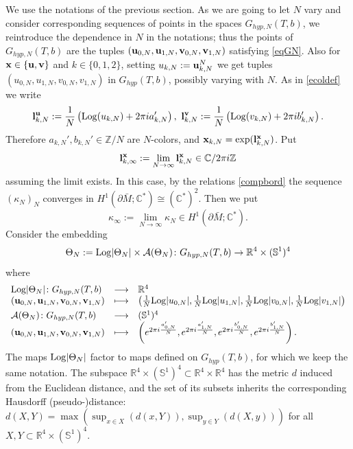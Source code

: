 \documentclass[11pt]{amsart}
\newcommand{\fleche}[4]{                     %
            \begin{array}{lcll} #1 & \longrightarrow & #2 \\   %
                         #3 &\longmapsto & #4          %
            \end{array}}
\newcommand{\mc}{\mathbb{C}}
\newcommand{\mz}{\mathbb{Z}}
\newcommand{\bu}{{\bf u}}
\newcommand{\bx}{{\bf x}}
\newcommand{\bv}{{\bf v}}
\newcommand{\bl}{{\bf l}}
\newcommand{\Log}{{\rm Log}}
\begin{document}
{We use the notations of the previous section. As we are going to let $N$ vary and consider corresponding sequences of points in the spaces $G_{hyp,N}(T,b)$, we reintroduce the dependence in $N$ in the notations; thus the points of $G_{hyp,N}(T,b)$ are the tuples $(\bu_{0,N},\bu_{1,N},\bv_{0,N},\bv_{1,N})$ satisfying \eqref{eqGN}. Also for ${\bf x}\in \{\bu,\bv\}$ and $k\in\{0,1,2\}$, setting $u_{k,N} := \bu_{k,N}^N$ we get tuples $(u_{0,N},u_{1,N},v_{0,N},v_{1,N})$ in $G_{hyp}(T,b)$, possibly varying with $N$. As in \eqref{ecoldef} we write
\begin{equation}\label{defseqNcolor}\bl_{k,N}^\bu := \frac{1}{N}\left(\Log(u_{k,N})+2\pi i a_{k,N}' \right),\  \bl_{k,N}^\bv := \frac{1}{N}\left(\Log(v_{k,N})+2\pi i b_{k,N}' \right).
\end{equation}
Therefore $a_{k,N}',b_{k,N}'\in \mz/N$ are $N$-colors, and $\bx_{k,N} = \exp(\bl_{k,N}^\bx)$. Put
\begin{equation}\label{deflimlkmars26}
\bl_{k,\infty}^{\bf x} := \lim_{N\rightarrow \infty} \bl_{k,N}^{\bf x}  \in \mc/2\pi i \mz
\end{equation}
assuming the limit exists. In this case, by the relations \eqref{compbord} the sequence $(\kappa_N)_N$ converges in $H^1(\partial \bar M; \mc^*) \cong (\mc^*)^2$. Then we put
$$\kappa_\infty := \lim_{N\rightarrow \infty}\kappa_N  \in H^1(\partial \bar M; \mc^*).$$
Consider the embedding
$$\Theta_N := {\rm Log}\vert \Theta_N\vert \times \mathcal{A}(\Theta_N)\colon G_{hyp,N}(T,b)\rightarrow \mathbb{R}^{4}\times (\mathbb{S}^1)^4$$
where
\begin{align*}
 & \fleche{{\rm Log}\vert \Theta_N\vert\colon G_{hyp,N}(T,b)}{\mathbb{R}^{4}}{(\bu_{0,N},\bu_{1,N},\bv_{0,N},\bv_{1,N})}{\left(\frac{1}{N} {\rm Log}\vert u_{0,N}\vert,\frac{1}{N} {\rm Log}\vert u_{1,N}\vert,\frac{1}{N} {\rm Log}\vert v_{0,N}\vert,\frac{1}{N} {\rm Log}\vert v_{1,N}\vert\right)}\\
& \fleche{\mathcal{A}(\Theta_N)\colon G_{hyp,N}(T,b)}{(\mathbb{S}^1)^4}{(\bu_{0,N},\bu_{1,N},\bv_{0,N},\bv_{1,N})}{\left(e^{2\pi i \frac{a_{0,N}'}{N}},e^{2\pi i \frac{a_{1,N}'}{N}},e^{2\pi i \frac{b_{0,N}'}{N}}, e^{2\pi i \frac{b_{1,N}'}{N}}\right).}
\end{align*}
The maps ${\rm Log}\vert \Theta_N\vert$ factor to maps defined on $G_{hyp}(T,b)$, for which we keep the same notation. The subspace $\mathbb{R}^{4}\times (\mathbb{S}^1)^4\subset \mathbb{R}^{4}\times\mathbb{R}^{4}$ has the metric $d$ induced from the Euclidean distance, and the set of its subsets inherits the corresponding Hausdorff (pseudo-)distance: $\textstyle d(X,Y) = \max(\sup_{x\in X}(d(x,Y)), \sup_{y\in Y}(d(X,y)))$ for all $X,Y\subset \mathbb{R}^{4}\times (\mathbb{S}^1)^4$. 
}
\end{document}
